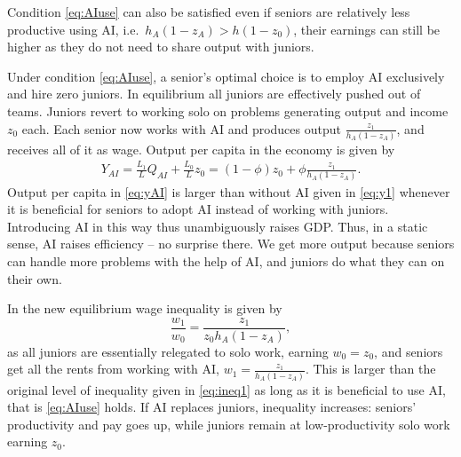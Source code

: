 \documentclass[12pt]{article}
\begin{document}
{%
Condition \eqref{eq:AIuse} can also be satisfied even if seniors are relatively less productive using AI, i.e.\ $h_A(1-z_A)>h(1-z_0)$, their earnings can still be higher as they do not need to share output with juniors. 

Under condition \eqref{eq:AIuse}, a senior's optimal choice is to employ AI exclusively and hire zero juniors. In equilibrium all juniors are effectively pushed out of teams. Juniors revert to working solo on problems generating output and income \(z_0\) each. Each senior now works with AI and produces output \(\frac{z_1}{h_A(1-z_A)}\), and receives all of it as wage. %
Output per capita in the economy is given by
\begin{align}\label{eq:yAI}
Y_{AI} = \frac{L_1}{L}Q_{AI}+\frac{L_0}{L}z_0=(1-\phi)z_0+\phi\frac{z_1}{h_A(1-z_A)}.
\end{align}
Output per capita in \eqref{eq:yAI} is larger than without AI given in \eqref{eq:y1} whenever it is beneficial for seniors to adopt AI instead of working with juniors. Introducing AI in this way thus unambiguously raises GDP. Thus, in a static sense, AI raises efficiency -- no surprise there. We get more output because seniors can handle more problems with the help of AI, and juniors do what they can on their own.

In the new equilibrium wage inequality is given by
\begin{displaymath}
\frac{w_1}{w_0} = \frac{z_1}{z_0h_A(1-z_A)},
\end{displaymath}
as all juniors are essentially relegated to solo work, earning \(w_0 = z_0\), and seniors get all the rents from working with AI, \(w_1 = \frac{z_1}{h_A(1-z_A)}\). This is larger than the original level of inequality given in \eqref{eq:ineq1} as long as it is beneficial to use AI, that is \eqref{eq:AIuse} holds. If AI replaces juniors, inequality increases: seniors' productivity and pay goes up, while juniors remain at low-productivity solo work earning \(z_0\).


}
\end{document}
